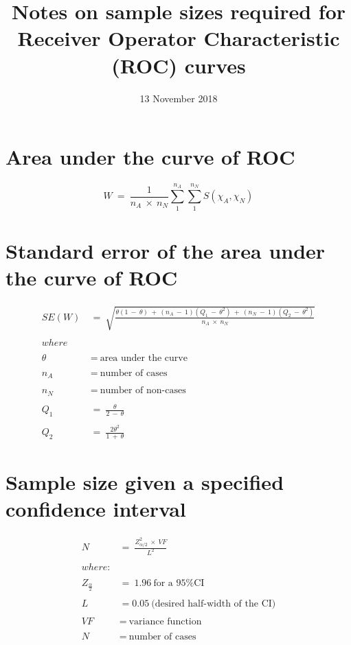 \documentclass[12pt,a4paper]{article}
\title{Notes on sample sizes required for Receiver Operator Characteristic
(ROC) curves}
\author{}
\date{13 November 2018}
\theoremstyle{definition}
\theoremstyle{definition}
\theoremstyle{definition}
\theoremstyle{remark}
\begin{document}
\maketitle

\hypertarget{area-under-the-curve-of-roc}{%
\section{Area under the curve of
ROC}\label{area-under-the-curve-of-roc}}

\[ W ~ = ~ \frac{1}{n_A ~ \times ~ n_N} \sum_1 ^ {n_A}\sum_1 ^ {n_N} S(\chi_A,\chi_N) \]

\hypertarget{standard-error-of-the-area-under-the-curve-of-roc}{%
\section{Standard error of the area under the curve of
ROC}\label{standard-error-of-the-area-under-the-curve-of-roc}}

\[ \begin{aligned}
SE(W) ~ & = ~ \sqrt{\frac{\theta(1 ~ - ~ \theta) ~ + ~ (n_A ~ - ~ 1)(Q_1 ~ - ~ \theta ^ 2) ~ + ~ (n_N ~ - ~ 1)(Q_2 ~ - ~ \theta ^ 2)}{n_A ~ \times ~ n_N}} \\ 
\\
where & \\
\\
\theta ~ & = ~ \text{area under the curve} \\
\\
n_A ~ & = ~ \text{number of cases} \\
\\
n_N ~ & = ~ \text{number of non-cases} \\
\\
Q_1 ~ & = ~ \frac{\theta}{2 ~ - ~ \theta} \\
\\
Q_2 ~ & = ~ \frac{2\theta^2}{1 ~ + ~ \theta}
\end{aligned} \]

\hypertarget{sample-size-given-a-specified-confidence-interval}{%
\section{Sample size given a specified confidence
interval}\label{sample-size-given-a-specified-confidence-interval}}

\[ \begin{aligned}
N ~ & = ~ \frac{Z_{\alpha/2} ^ 2 ~ \times ~ VF}{L ^ 2} \\
\\
where: & \\
\\
Z_{\frac{\alpha}{2}} ~ & = ~ 1.96 ~ \text{for a 95\% CI} \\
\\
L ~ & = 0.05 ~ \text{(desired half-width of the CI)} \\
\\
VF ~ & = ~ \text{variance function}  \\
\\
N ~ & = ~ \text{number of cases}
\end{aligned} \]
\end{document}
